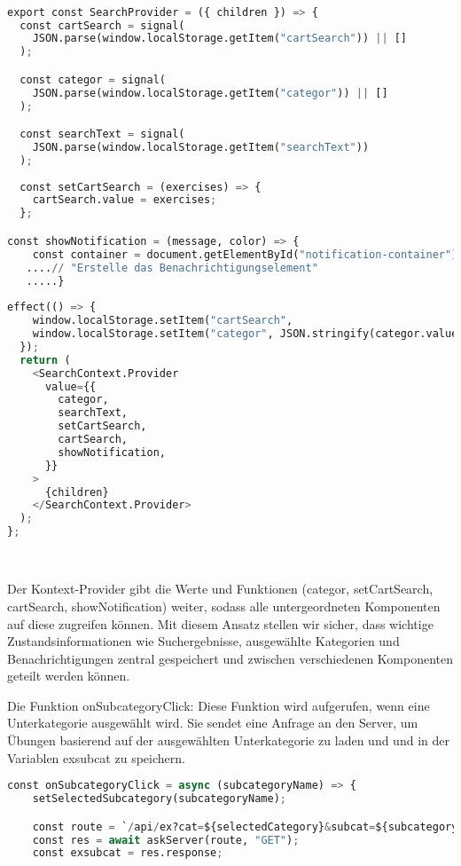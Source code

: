\documentclass[12pt,a4paper]{article} %
\begin{document}
\begin{lstlisting}[language=Python]

export const SearchProvider = ({ children }) => {
  const cartSearch = signal(
    JSON.parse(window.localStorage.getItem("cartSearch")) || []
  );

  const categor = signal(
    JSON.parse(window.localStorage.getItem("categor")) || []
  );

  const searchText = signal(
    JSON.parse(window.localStorage.getItem("searchText"))
  );
  
  const setCartSearch = (exercises) => {
    cartSearch.value = exercises;
  };

const showNotification = (message, color) => {
    const container = document.getElementById("notification-container");
   ....// "Erstelle das Benachrichtigungselement"
   .....}
   
effect(() => {
    window.localStorage.setItem("cartSearch", 
    window.localStorage.setItem("categor", JSON.stringify(categor.value));
  });
  return (
    <SearchContext.Provider
      value={{
        categor,
        searchText,
        setCartSearch,
        cartSearch,
        showNotification,
      }}
    >
      {children}
    </SearchContext.Provider>
  );
};




 \end{lstlisting}  
Der Kontext-Provider gibt die Werte und Funktionen (categor, setCartSearch, cartSearch, showNotification) weiter, sodass alle untergeordneten Komponenten auf diese zugreifen können.
Mit diesem Ansatz stellen wir sicher, dass wichtige Zustandsinformationen wie Suchergebnisse, ausgewählte Kategorien und Benachrichtigungen zentral gespeichert und zwischen verschiedenen Komponenten geteilt werden können. 


Die Funktion onSubcategoryClick: Diese Funktion wird aufgerufen, wenn eine Unterkategorie ausgewählt wird. Sie sendet eine Anfrage an den Server, um Übungen basierend auf der ausgewählten Unterkategorie zu laden und und in der Variablen exsubcat zu speichern.

\begin{lstlisting}[language=Python]
  const onSubcategoryClick = async (subcategoryName) => {
    setSelectedSubcategory(subcategoryName);

    const route = `/api/ex?cat=${selectedCategory}&subcat=${subcategoryName}`;
    const res = await askServer(route, "GET");
    const exsubcat = res.response;
    
    
\end{lstlisting}
\end{document}
